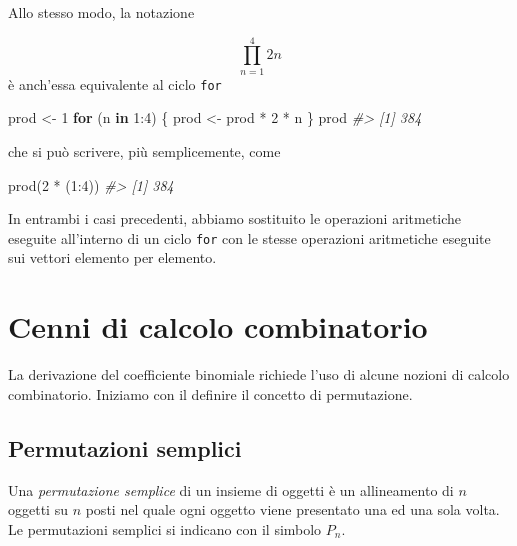 \documentclass[
  11pt,
]{krantz}
\makeatletter
\newenvironment{Shaded}{\begin{snugshade}}{\end{snugshade}}
\newcommand{\CommentTok}[1]{\textcolor[rgb]{0.37,0.37,0.37}{\textit{#1}}}
\newcommand{\ControlFlowTok}[1]{\textcolor[rgb]{0.27,0.27,0.27}{\textbf{#1}}}
\newcommand{\DecValTok}[1]{\textcolor[rgb]{0.06,0.06,0.06}{#1}}
\newcommand{\FunctionTok}[1]{\textcolor[rgb]{0,0,0}{#1}}
\newcommand{\NormalTok}[1]{#1}
\newcommand{\OtherTok}[1]{\textcolor[rgb]{0.37,0.37,0.37}{#1}}
\newcommand{\SpecialCharTok}[1]{\textcolor[rgb]{0,0,0}{#1}}
\newenvironment{kframe}{%
\medskip{}
\setlength{\fboxsep}{.8em}
 \def\at@end@of@kframe{}%
 \ifinner\ifhmode%
  \def\at@end@of@kframe{\end{minipage}}%
  \begin{minipage}{\columnwidth}%
 \fi\fi%
 \def\FrameCommand##1{\hskip\@totalleftmargin \hskip-\fboxsep
 \colorbox{shadecolor}{##1}\hskip-\fboxsep
     \hskip-\linewidth \hskip-\@totalleftmargin \hskip\columnwidth}%
 \MakeFramed {\advance\hsize-\width
   \@totalleftmargin\z@ \linewidth\hsize
   \@setminipage}}%
 {\par\unskip\endMakeFramed%
 \at@end@of@kframe}
\renewenvironment{Shaded}{\begin{kframe}}{\end{kframe}}
\theoremstyle{definition}
\theoremstyle{definition}
\theoremstyle{definition}
\theoremstyle{definition}
\theoremstyle{remark}
\makeatother
\begin{document}
Allo stesso modo, la notazione

\[
\prod_{n=1}^{4} 2n
\] è anch'essa equivalente al ciclo \texttt{for}

\begin{Shaded}
\begin{Highlighting}[]
\NormalTok{prod }\OtherTok{\textless{}{-}} \DecValTok{1}
\ControlFlowTok{for}\NormalTok{ (n }\ControlFlowTok{in} \DecValTok{1}\SpecialCharTok{:}\DecValTok{4}\NormalTok{) \{}
\NormalTok{  prod }\OtherTok{\textless{}{-}}\NormalTok{ prod }\SpecialCharTok{*} \DecValTok{2} \SpecialCharTok{*}\NormalTok{ n}
\NormalTok{\}}
\NormalTok{prod}
\CommentTok{\#\textgreater{} [1] 384}
\end{Highlighting}
\end{Shaded}

che si può scrivere, più semplicemente, come

\begin{Shaded}
\begin{Highlighting}[]
\FunctionTok{prod}\NormalTok{(}\DecValTok{2} \SpecialCharTok{*}\NormalTok{ (}\DecValTok{1}\SpecialCharTok{:}\DecValTok{4}\NormalTok{))}
\CommentTok{\#\textgreater{} [1] 384}
\end{Highlighting}
\end{Shaded}

In entrambi i casi precedenti, abbiamo sostituito le operazioni aritmetiche eseguite all'interno di un ciclo \texttt{for} con le stesse operazioni aritmetiche eseguite sui vettori elemento per elemento.

\hypertarget{derivazione-coef-binom}{%
\chapter{Cenni di calcolo combinatorio}\label{derivazione-coef-binom}}

La derivazione del coefficiente binomiale richiede l'uso di alcune nozioni di calcolo combinatorio. Iniziamo con il definire il concetto di permutazione.

\hypertarget{permutazioni-semplici}{%
\section{Permutazioni semplici}\label{permutazioni-semplici}}

Una \emph{permutazione semplice} di un insieme di oggetti è un allineamento di \(n\) oggetti su \(n\) posti nel quale ogni oggetto viene presentato una ed una sola volta. Le permutazioni semplici si indicano con il simbolo \(P_{n}\).
\end{document}
